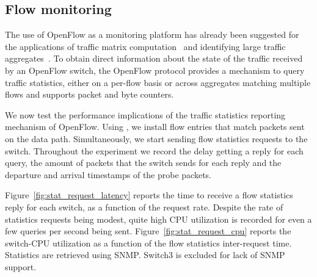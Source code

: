 \subsection{Flow monitoring}\label{sec:results-monitoring}

The use of OpenFlow as a monitoring platform has already been
suggested for the applications of traffic matrix
computation~\cite{opentm-pam,tm-presto} and identifying large traffic
aggregates~\cite{openflow-measurement-hotice}. To obtain direct
information about the state of the traffic received by an OpenFlow
switch, the OpenFlow protocol provides a mechanism to query traffic
statistics, either on a per-flow basis or across aggregates matching
multiple flows and supports packet and byte counters. 

We now test the performance implications of the traffic statistics reporting 
mechanism of OpenFlow. Using \oflops, we install flow entries that match 
packets sent on the data path. Simultaneously, we start sending flow statistics 
requests to the switch. Throughout the experiment we record the delay getting 
a reply for each query, the amount of packets that the switch sends for each 
reply and the departure and arrival timestamps of the probe packets.

Figure~\ref{fig:stat_request_latency} reports the time to receive a flow
statistics reply for each switch, as a function of the request
rate. Despite the rate of statistics requests being modest, quite high
CPU utilization is recorded for even a few queries per second being
sent. Figure~\ref{fig:stat_request_cpu} reports the switch-CPU utilization
as a function of the flow statistics inter-request time. Statistics
are retrieved using SNMP. Switch3 is excluded for lack of SNMP
support.

